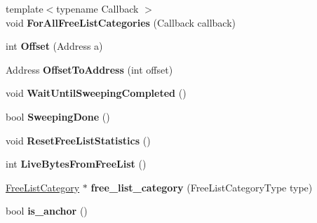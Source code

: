 \begin{DoxyCompactItemize}
\item 
{\footnotesize template$<$typename Callback $>$ }\\void {\bfseries For\+All\+Free\+List\+Categories} (Callback callback)\hypertarget{classv8_1_1internal_1_1_page_a4f5fcd786532dff7189ee94d93edb0b4}{}\label{classv8_1_1internal_1_1_page_a4f5fcd786532dff7189ee94d93edb0b4}

\item 
int {\bfseries Offset} (Address a)\hypertarget{classv8_1_1internal_1_1_page_a509faa04f343d9c822577f7608d3d690}{}\label{classv8_1_1internal_1_1_page_a509faa04f343d9c822577f7608d3d690}

\item 
Address {\bfseries Offset\+To\+Address} (int offset)\hypertarget{classv8_1_1internal_1_1_page_ad509ccd737af65973e04fe119d951d13}{}\label{classv8_1_1internal_1_1_page_ad509ccd737af65973e04fe119d951d13}

\item 
void {\bfseries Wait\+Until\+Sweeping\+Completed} ()\hypertarget{classv8_1_1internal_1_1_page_a543e951f0c5b487bf13761a5fff415a6}{}\label{classv8_1_1internal_1_1_page_a543e951f0c5b487bf13761a5fff415a6}

\item 
bool {\bfseries Sweeping\+Done} ()\hypertarget{classv8_1_1internal_1_1_page_a3b44e510cf401d1288b30eebad730070}{}\label{classv8_1_1internal_1_1_page_a3b44e510cf401d1288b30eebad730070}

\item 
void {\bfseries Reset\+Free\+List\+Statistics} ()\hypertarget{classv8_1_1internal_1_1_page_a7c6c838391e9167bf352cd31ea9a394a}{}\label{classv8_1_1internal_1_1_page_a7c6c838391e9167bf352cd31ea9a394a}

\item 
int {\bfseries Live\+Bytes\+From\+Free\+List} ()\hypertarget{classv8_1_1internal_1_1_page_aee49cebe2d4e98b166439eddada6cb0b}{}\label{classv8_1_1internal_1_1_page_aee49cebe2d4e98b166439eddada6cb0b}

\item 
\hyperlink{classv8_1_1internal_1_1_free_list_category}{Free\+List\+Category} $\ast$ {\bfseries free\+\_\+list\+\_\+category} (Free\+List\+Category\+Type type)\hypertarget{classv8_1_1internal_1_1_page_a961113fb07d7d0b532a50181b5bf1c76}{}\label{classv8_1_1internal_1_1_page_a961113fb07d7d0b532a50181b5bf1c76}

\item 
bool {\bfseries is\+\_\+anchor} ()\hypertarget{classv8_1_1internal_1_1_page_ade8285ea7efcc3b4bf8776aa639ef3b0}{}\label{classv8_1_1internal_1_1_page_ade8285ea7efcc3b4bf8776aa639ef3b0}


\end{DoxyCompactItemize}
